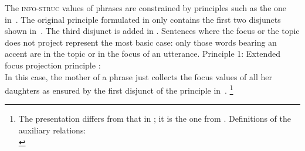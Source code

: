 \documentclass[output=paper,biblatex,babelshorthands,newtxmath,draftmode,colorlinks,citecolor=brown]{langscibook}
\begin{document}
    \label{fig:focus-backgr}
\z
The \textsc{info-struc} values of phrases are constrained by
principles such as the one in~. The
original principle formulated in  only
contains the first two disjuncts shown
in~. The third disjunct is added in
. Sentences where the focus or the topic does not
project represent the most basic case: only those words bearing an
accent are in the topic or in the focus of an utterance.
\largerpage[2]
\ea
Principle 1: Extended focus projection principle \citep[105]{dKM2003a}:\\
  \label{fig:focus-projection}
\z
In this case, the mother of a phrase just collects the focus values of
all her daughters as ensured by the first disjunct of the principle in~.%
\footnote{The presentation differs from that in
  \citet{deKuthy2002a}; it is the one from . Definitions of the auxiliary relations:\\
}
\end{document}
